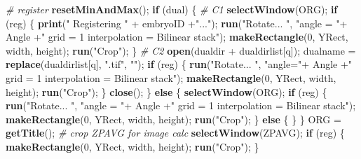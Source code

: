 \documentclass[11pt,singlespacinge,twoside]{reedthesis} %
\newenvironment{Shaded}{}{}
\newcommand{\CommentTok}[1]{\textit{#1}}
\newcommand{\ControlFlowTok}[1]{\textbf{#1}}
\newcommand{\DecValTok}[1]{#1}
\newcommand{\KeywordTok}[1]{\textbf{#1}}
\newcommand{\NormalTok}[1]{#1}
\newcommand{\OperatorTok}[1]{#1}
\newcommand{\StringTok}[1]{#1}
\theoremstyle{definition}
\theoremstyle{definition}
\theoremstyle{definition}
\theoremstyle{remark}
\begin{document}
\begin{Shaded}
\begin{Highlighting}[numbers=left,,]
    \CommentTok{# register}
        \KeywordTok{resetMinAndMax}\NormalTok{();}
        \ControlFlowTok{if}\NormalTok{ (dual) \{}
        \CommentTok{#   C1}
            \KeywordTok{selectWindow}\NormalTok{(ORG);}
            \ControlFlowTok{if}\NormalTok{ (reg) \{}
                \KeywordTok{print}\NormalTok{(}\StringTok{"  Registering "} \OperatorTok{+}\StringTok{ }\NormalTok{embryoID }\OperatorTok{+}\StringTok{"..."}\NormalTok{);}
                \KeywordTok{run}\NormalTok{(}\StringTok{"Rotate... "}\NormalTok{, }
                    \StringTok{"angle = "}\OperatorTok{+}\StringTok{ }\NormalTok{Angle }\OperatorTok{+}\StringTok{" grid = 1 interpolation = Bilinear stack"}\NormalTok{);}
                \KeywordTok{makeRectangle}\NormalTok{(}\DecValTok{0}\NormalTok{, YRect, width, height);}
                \KeywordTok{run}\NormalTok{(}\StringTok{"Crop"}\NormalTok{);}
\NormalTok{            \}}
        \CommentTok{# C2}
            \KeywordTok{open}\NormalTok{(dualdir }\OperatorTok{+}\StringTok{ }\NormalTok{dualdirlist[q]);}
\NormalTok{            dualname =}\StringTok{ }\KeywordTok{replace}\NormalTok{(dualdirlist[q], }\StringTok{".tif"}\NormalTok{, }\StringTok{""}\NormalTok{);}
            \ControlFlowTok{if}\NormalTok{ (reg) \{}
                \KeywordTok{run}\NormalTok{(}\StringTok{"Rotate... "}\NormalTok{,}
                    \StringTok{"angle="}\OperatorTok{+}\StringTok{ }\NormalTok{Angle }\OperatorTok{+}\StringTok{" grid = 1 interpolation = Bilinear stack"}\NormalTok{);}
                \KeywordTok{makeRectangle}\NormalTok{(}\DecValTok{0}\NormalTok{, YRect, width, height);}
                \KeywordTok{run}\NormalTok{(}\StringTok{"Crop"}\NormalTok{);}
\NormalTok{            \}}
            \KeywordTok{close}\NormalTok{();}
\NormalTok{        \} }\ControlFlowTok{else}\NormalTok{ \{}
            \KeywordTok{selectWindow}\NormalTok{(ORG);}
            \ControlFlowTok{if}\NormalTok{ (reg) \{}
                \KeywordTok{run}\NormalTok{(}\StringTok{"Rotate... "}\NormalTok{,}
                    \StringTok{"angle = "}\OperatorTok{+}\StringTok{ }\NormalTok{Angle }\OperatorTok{+}\StringTok{" grid = 1 interpolation = Bilinear stack"}\NormalTok{);}
                \KeywordTok{makeRectangle}\NormalTok{(}\DecValTok{0}\NormalTok{, YRect, width, height);}
                \KeywordTok{run}\NormalTok{(}\StringTok{"Crop"}\NormalTok{);}
\NormalTok{            \} }\ControlFlowTok{else}\NormalTok{ \{    }
\NormalTok{            \}}
\NormalTok{        \}}
\NormalTok{        ORG =}\StringTok{ }\KeywordTok{getTitle}\NormalTok{();}
    \CommentTok{# crop ZPAVG for image calc}
        \KeywordTok{selectWindow}\NormalTok{(ZPAVG);}
        \ControlFlowTok{if}\NormalTok{ (reg) \{}
        \KeywordTok{makeRectangle}\NormalTok{(}\DecValTok{0}\NormalTok{, YRect, width, height);}
        \KeywordTok{run}\NormalTok{(}\StringTok{"Crop"}\NormalTok{);}
\NormalTok{        \}}
\end{Highlighting}
\end{Shaded}
\normalsize
\end{document}
